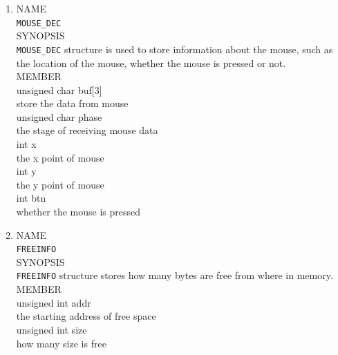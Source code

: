 \documentclass{swfcthesis}
\begin{document}
\begin{enumerate}
  \item
  NAME \\
  \hspace*{1cm}\texttt{MOUSE\_DEC} \\
  SYNOPSIS \\
  \hspace*{1cm} \texttt{MOUSE\_DEC} structure is used to store
information about the mouse, such as the location of the mouse, whether the mouse is
pressed or not.\\
  MEMBER \\
  \hspace*{1cm} unsigned char buf[3]\\
  \hspace*{1.5cm}  store the data from mouse\\
  \hspace*{1cm} unsigned char phase\\
  \hspace*{1.5cm} the stage of receiving mouse data\\
  \hspace*{1cm} int x\\
  \hspace*{1.5cm} the x point of mouse\\
  \hspace*{1cm} int y\\
  \hspace*{1.5cm} the y point of mouse\\
  \hspace*{1cm} int btn\\
  \hspace*{1.5cm} whether the mouse is pressed\\

  \item
  NAME \\
  \hspace*{1cm}\texttt{FREEINFO} \\
  SYNOPSIS \\
  \hspace*{1cm} \texttt{FREEINFO} structure stores how many bytes are
free from where in memory.\\
  MEMBER \\
  \hspace*{1cm} unsigned int addr\\
  \hspace*{1.5cm}  the starting address of free space\\
  \hspace*{1cm} unsigned int size\\
  \hspace*{1.5cm} how many size is free\\


\end{enumerate}
\end{document}
